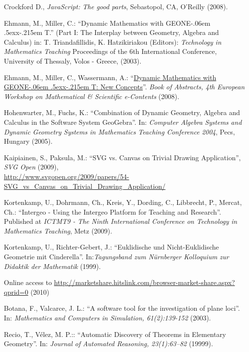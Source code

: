 \documentclass[12pt,a4paper]{article}%
\def\GEONExT{GEONE\kern-.06em \lower.5ex\hbox{x}\kern-.215em T}
\begin{document}
\begin{thebibliography}{99}
     Crockford D., \emph{JavaScript: The good parts}, Sebastopol, CA, O'Reilly (2008).
    
     Ehmann, M., Miller, C.: ``Dynamic Mathematics with \GEONExT.''
        (Part I: The Interplay between Geometry, Algebra and Calculus)
        in: T. Triandafillidis, K. Hatzikiriakou (Editors): \emph{Technology in Mathematics Teaching}
        Proceedings of the 6th International Conference, University of Thessaly, Volos - Greece, (2003).
 
     Ehmann, M., Miller, C., Wassermann, A.: 
        ``\href{http://jsxgraph.uni-bayreuth.de/talks/jsxgraphMathematical_and_Scientific_e-Contents.pdf}{Dynamic Mathematics with \GEONExT{}: New Concepts}''. 
        \emph{Book of Abstracts, 4th European Workshop on Mathematical \& Scientific e-Contents}
        (2008).   

     Hohenwarter, M., Fuchs, K.: 
        ``Combination of Dynamic Geometry, Algebra and Calculus in the Software System GeoGebra''.  
        In: \emph{Computer Algebra Systems and Dynamic Geometry Systems in Mathematics Teaching Conference 2004}, 
        Pecs, Hungary (2005).

     Kaipiainen, S., Paksula, M.: 
           ``SVG vs. Canvas on Trivial Drawing Application'', \emph{SVG Open} (2009), \\
              \href{http://www.svgopen.org/2009/papers/54-SVG_vs_Canvas_on_Trivial_Drawing_Application/}{http://www.svgopen.org/2009/papers/54-SVG\_vs\_Canvas\_on\_Trivial\_Drawing\_Application/}

     Kortenkamp, U., Dohrmann, Ch., Kreis, Y., Dording, C., Libbrecht, P., Mercat, Ch.:
        ``Intergeo - Using the Intergeo Platform for Teaching and Research''. 
            Published at \emph{ICTMT9 - The Ninth International Conference on Technology in Mathematics Teaching},
            Metz (2009).

     Kortenkamp, U., Richter-Gebert, J.: 
        ``Euklidische und Nicht-Euklidische Geometrie mit Cinderella''. 
        In:\emph{Tagungsband zum N\"{u}rnberger Kolloquium zur Didaktik der Mathematik} (1999).
    
    
     Online access to \href{http://marketshare.hitslink.com/browser-market-share.aspx?qprid=0}{http://marketshare.hitslink.com/browser-market-share.aspx?qprid=0} (2010)

     Botana, F., Valcarce, J. L.:
        ``A software tool for the investigation of plane loci''.
        In: \emph{Mathematics and Computers in Simulation, 61(2):139-152} (2003).

     Recio, T., V\'elez, M. P.::
        ``Automatic Discovery of Theorems in Elementary Geometry''.
        In: \emph{Journal of Automated Reasoning, 23(1):63–82} (19999).

\end{thebibliography}
\end{document}
